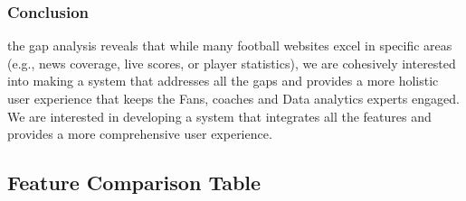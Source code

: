 \subsubsection{Conclusion}
the gap analysis reveals that while many football websites excel in specific areas (e.g., news coverage, live scores, or player statistics), we are cohesively interested into making a system that addresses all the gaps and provides a more holistic user experience that keeps the Fans, coaches and Data analytics experts engaged. We are interested in developing a system that integrates all the features and provides a more comprehensive user experience.

\subsection{Feature Comparison Table}

